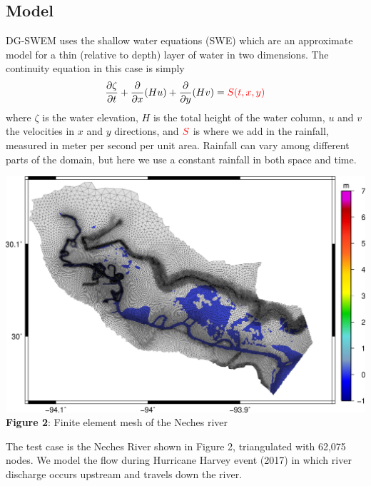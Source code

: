 \documentclass[american]{article}
\newcommand\pd[2]{\frac{\partial #1}{\partial #2}}
\begin{document}
\begin{multicols}{3}
\hrulefill

\section*{Model}
\noindent DG-SWEM uses the shallow water equations (SWE) which are an approximate model for a thin (relative to depth) layer of water in two dimensions. The continuity equation in this case is simply
\begin{align*}
  \pd{\zeta}{t} + \pd{}{x} (Hu) + \pd{}{y} (Hv) = {\color{red} S(t,x,y)}
\end{align*}
where $\zeta$ is the water elevation, $H$ is the total height of the water column, $u$ and $v$ the velocities in $x$ and $y$ directions, and $\color{red} S$ is where we add in the rainfall, measured in meter per second per unit area. Rainfall can vary among different parts of the domain, but here we use a constant rainfall in both space and time.

\begin{center}
  \vspace{5mm}
  \includegraphics[width=0.95\linewidth]{media/grid.jpg}
  \textbf{Figure 2}: Finite element mesh of the Neches river
\end{center}

The test case is the Neches River shown in Figure 2, triangulated with 62,075 nodes. We model the flow during Hurricane Harvey event (2017) in which river discharge occurs upstream and travels down the river.

\hrulefill

\end{multicols}
\end{document}
